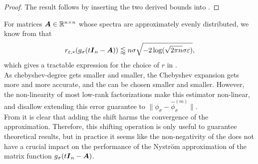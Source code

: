 \begin{proof}
    The result follows by inserting the two derived bounds into
    .
\end{proof}

For matrices $\boldsymbol{A} \in \mathbb{R}^{n \times n}$ whose spectra are approximately
evenly distributed, we know from  that
\begin{equation}
    r_{\varepsilon, \ast}(g_{\sigma}(t\boldsymbol{I}_n - \boldsymbol{A})) \lessapprox n \sigma \sqrt{-2\log(\sqrt{2 \pi n} \sigma \varepsilon)},
\end{equation}
which gives a tractable expression for the choice of $r$ in .\\

As \gls{chebyshev-degree} gets smaller and smaller, the Chebyshev expansion gets
more and more accurate, and the  can be chosen smaller and smaller.
However, the non-linearity of most low-rank factorizations make this estimator
non-linear, and disallow extending this error guarantee to
$\lVert \phi_{\sigma} - \widehat{\phi}_{\sigma}^{(m)} \rVert$.\\

From  it is clear that adding the shift harms the
convergence of the approximation. Therefore, this shifting operation is only
useful to guarantee theoretical results, but in practice it seems like the
non-negativity of the  does not have a crucial
impact on the performance of the Nystr\"om approximation of the matrix function
$g_{\sigma}(t\boldsymbol{I}_n - \boldsymbol{A})$.


